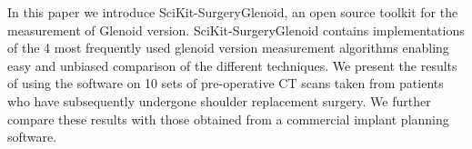 In this paper we introduce SciKit-SurgeryGlenoid, an open source toolkit for the measurement
of Glenoid version. SciKit-SurgeryGlenoid contains implementations of the 4 most    
frequently used glenoid version measurement algorithms enabling easy and unbiased comparison of
the different techniques. We present the results of using the software on 10 sets of
pre-operative CT scans taken from patients who have subsequently undergone shoulder replacement surgery. We further compare these results with those obtained from a commercial
implant planning software.

